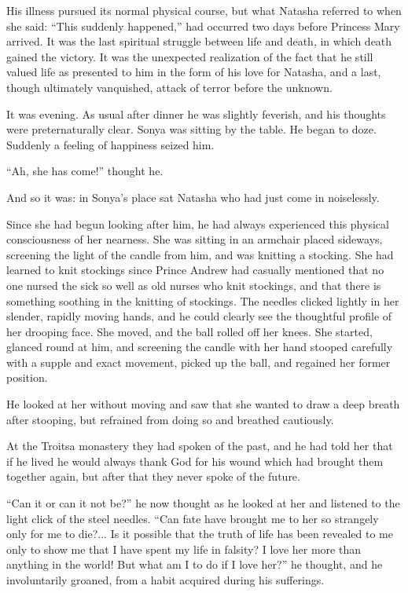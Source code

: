 His illness pursued its normal physical course, but what Natasha
referred to when she said: ``This suddenly happened,'' had
occurred two days before Princess Mary arrived. It was the last
spiritual struggle between life and death, in which death gained
the victory. It was the unexpected realization of the fact that
he still valued life as presented to him in the form of his love
for Natasha, and a last, though ultimately vanquished, attack of
terror before the unknown.

It was evening. As usual after dinner he was slightly feverish,
and his thoughts were preternaturally clear. Sonya was sitting by
the table. He began to doze. Suddenly a feeling of happiness
seized him.

``Ah, she has come!'' thought he.

And so it was: in Sonya's place sat Natasha who had just come in
noiselessly.

Since she had begun looking after him, he had always experienced
this physical consciousness of her nearness. She was sitting in
an armchair placed sideways, screening the light of the candle
from him, and was knitting a stocking. She had learned to knit
stockings since Prince Andrew had casually mentioned that no one
nursed the sick so well as old nurses who knit stockings, and
that there is something soothing in the knitting of
stockings. The needles clicked lightly in her slender, rapidly
moving hands, and he could clearly see the thoughtful profile of
her drooping face. She moved, and the ball rolled off her
knees. She started, glanced round at him, and screening the
candle with her hand stooped carefully with a supple and exact
movement, picked up the ball, and regained her former position.

He looked at her without moving and saw that she wanted to draw a
deep breath after stooping, but refrained from doing so and
breathed cautiously.

At the Troitsa monastery they had spoken of the past, and he had
told her that if he lived he would always thank God for his wound
which had brought them together again, but after that they never
spoke of the future.

``Can it or can it not be?'' he now thought as he looked at her
and listened to the light click of the steel needles. ``Can fate
have brought me to her so strangely only for me to die?... Is it
possible that the truth of life has been revealed to me only to
show me that I have spent my life in falsity? I love her more
than anything in the world! But what am I to do if I love her?''
he thought, and he involuntarily groaned, from a habit acquired
during his sufferings.

